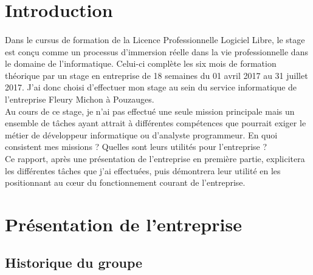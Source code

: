 \documentclass[a4paper,12pt]{extarticle}
\begin{document}
	\clearpage
	
	\section{Introduction}
		\paragraph{}

	Dans le cursus de formation de la Licence Professionnelle Logiciel Libre, le stage est conçu comme un processus d’immersion réelle dans la vie professionnelle dans le domaine de l’informatique. Celui-ci complète les six mois de formation théorique par un stage en entreprise de 18 semaines du 01 avril 2017 au 31 juillet 2017.
J’ai donc choisi d’effectuer mon stage au sein du service informatique de l’entreprise Fleury Michon à Pouzauges.\\
Au cours de ce stage, je n’ai pas effectué une seule mission principale mais un ensemble de tâches ayant attrait à différentes compétences que pourrait exiger le métier de développeur informatique ou d’analyste programmeur. En quoi consistent mes missions ? Quelles sont leurs utilités pour l’entreprise ?\\
Ce rapport, après une présentation de l’entreprise en première partie, explicitera les différentes tâches que j’ai effectuées, puis démontrera leur utilité en les positionnant au cœur du fonctionnement courant de l’entreprise.\\

	\clearpage
	
	\section{Présentation de l’entreprise}
	
	\subsection{Historique du groupe}
		\paragraph{}
\end{document}

